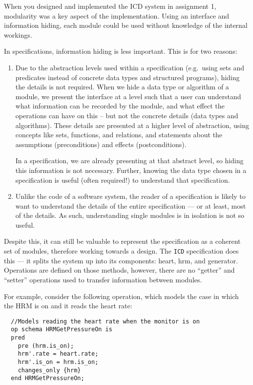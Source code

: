 \documentclass{article}
\begin{document}
When you designed and implemented the ICD system in assignment 1, modularity was a key aspect of the implementation. Using an interface and information hiding, each module could be used without knowledge of the internal workings.

In specifications, information hiding is less important. This is for two reasons:

\begin{enumerate}

 \item Due to the abstraction levels used within a specification (e.g.\ using sets and predicates instead of concrete data types and structured programs), hiding the details is not required. When we hide a data type or algorithm of a module, we present the interface at a level such that a user can understand what information can be recorded by the module, and what effect the operations can have on this -- but not the concrete details (data types and algorithms). These details are presented at a higher level of abstraction, using concepts like sets, functions, and relations, and statements about the assumptions (preconditions) and effects (postconditions).

 In a specification, we are already presenting at that abstract level, so hiding this information is not necessary.  Further, knowing the data type chosen in a specification is useful (often required!) to understand that specification.

 \item Unlike the code of a software system, the reader of a specification is likely to want to understand the details of the entire specification --- or at least, most of the details. As such, understanding single modules is in isolation is not so useful.

\end{enumerate}

Despite this, it can still be valuable to represent the specification as a coherent set of modules, therefore working towards a design. The \texttt{ICD} specification does this --- it splits the system up into its components: heart, hrm, and generator. Operations are defined on those methods, however, there are no ``getter'' and ``setter'' operations used to transfer information between modules.

For example, consider the following operation, which models the case in which the HRM is on and it reads the heart rate:

\begin{lstlisting}
  //Models reading the heart rate when the monitor is on
  op schema HRMGetPressureOn is
  pred
    pre (hrm.is_on);
    hrm'.rate = heart.rate;
    hrm'.is_on = hrm.is_on;
    changes_only {hrm}
  end HRMGetPressureOn;
\end{lstlisting}
\end{document}
